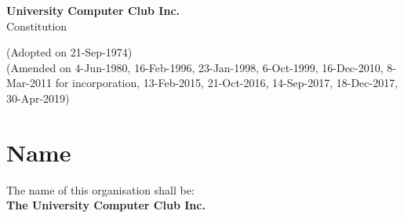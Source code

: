\documentclass[11pt]{article} %
\makeatletter
\renewcommand\tableofcontents{%
    \@starttoc{toc}%
}
\makeatother
\begin{document}
\noindent
\begin{center}
\textbf{\LARGE{University Computer Club Inc.}}\\
\Large{Constitution}
\end{center}

\noindent
\small{(Adopted on 21-Sep-1974)\\
(Amended on 4-Jun-1980, 16-Feb-1996, 23-Jan-1998, 6-Oct-1999, 16-Dec-2010, 8-Mar-2011 for incorporation, 13-Feb-2015, 21-Oct-2016, 14-Sep-2017, 18-Dec-2017, 30-Apr-2019)\\}

\begingroup
	\let\cleardoublepage\clearpage
	\def\addvspace#1{}
	\tableofcontents
\endgroup


\section{Name}
\begin{description}
	\item The name of this organisation shall be: \hfill \\
		\large{\textbf{The University Computer Club Inc.}}
\end{description}
\end{document}
